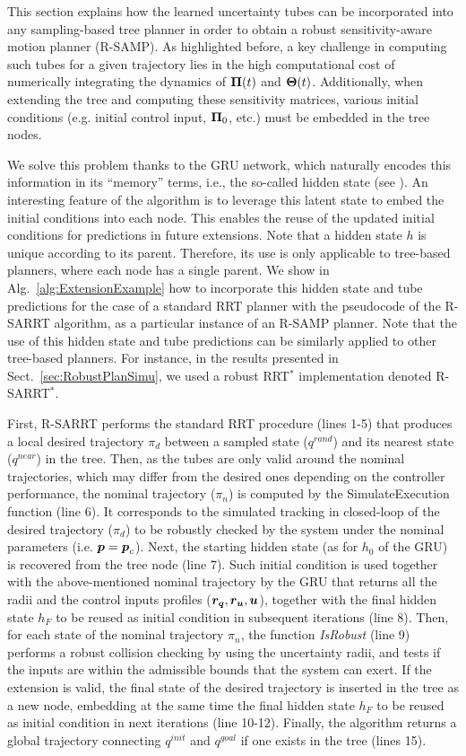 This section explains how the learned uncertainty tubes can be incorporated into any sampling-based tree planner in order to obtain a robust sensitivity-aware motion planner (R-SAMP).
As highlighted before, a key challenge in computing such tubes for a given trajectory lies in the high computational cost of numerically integrating the dynamics of $\boldsymbol{\Pi}(t)$ and $\boldsymbol{\Theta}(t)$.
Additionally, when extending the tree and computing these sensitivity matrices, various initial conditions (e.g. initial control input, $\boldsymbol{\Pi}_0$, etc.) must be embedded in the tree nodes.

We solve this problem thanks to the GRU network, which naturally encodes  this information in its ``memory'' terms, i.e., the so-called hidden state (see \cite{cGRU}).
An interesting feature of the algorithm is to leverage this latent state to embed the initial conditions into each node. This enables the reuse of the updated initial conditions for predictions in future extensions.
Note that a hidden state $h$ is unique according to its parent.
Therefore, its use is only applicable to tree-based planners, where each node has a single parent.
We show in Alg.~\ref{alg:ExtensionExample} how to incorporate this hidden state and tube predictions for the case of a standard RRT planner \cite{cRRT} with the pseudocode of the R-SARRT algorithm, as a particular instance of an R-SAMP planner. 
Note that the use of this hidden state and tube predictions can be similarly applied to other tree-based planners. For instance, in the results presented in Sect.~\ref{sec:RobustPlanSimu}, we used a robust RRT$^*$ implementation denoted R-SARRT$^*$.

First, R-SARRT performs the standard RRT procedure (lines 1-5) that produces a local desired trajectory $\pi_d$ between a sampled state (${q}^{rand}$) and its nearest state (${q}^{near}$) in the tree. 
Then, as the tubes are only valid around the nominal trajectories, which may differ from the desired ones depending on the controller performance, the nominal trajectory ($\pi_{n}$) is computed by the SimulateExecution function (line 6).
It corresponds to the simulated tracking in closed-loop of the desired trajectory ($\pi_d$) to be robustly checked by the system under the nominal parameters (i.e. $\boldsymbol{p} = \boldsymbol{p}_c$).
Next, the starting hidden state (as for $h_{0}$ of the GRU) is recovered from the tree node (line 7).
Such initial condition is used together with the above-mentioned nominal trajectory by the GRU that returns all the radii and the control inputs profiles ($\boldsymbol{r_q},\boldsymbol{r_u},\boldsymbol{u}$), together with the final hidden state $h_{F}$ to be reused as initial condition in subsequent iterations (line 8).
Then, for each state of the nominal trajectory $\pi_{n}$, the function \emph{IsRobust} (line 9) performs a robust collision checking by using the uncertainty radii, and tests if the inputs are within the admissible bounds that the system can exert.
If the extension is valid, the final state of the desired trajectory is inserted in the tree as a new node, embedding at the same time the final hidden state $h_{F}$ to be reused as initial condition in next iterations (line 10-12).
Finally, the algorithm returns a global trajectory connecting ${q}^{init}$ and ${q}^{goal}$ if one exists in the tree (lines 15).

